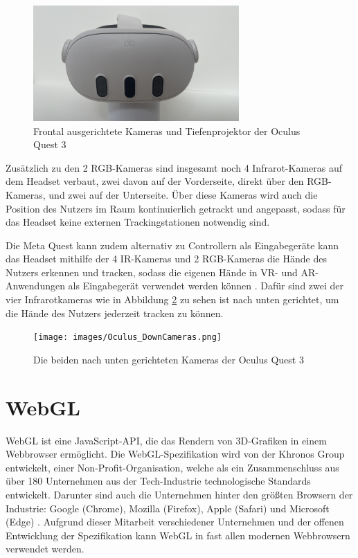 \begin{figure}[H]
  \centering
  \includegraphics[width=0.7\textwidth]{images/Oculus-FrontCameras.jpg}
  \caption{Frontal ausgerichtete Kameras und Tiefenprojektor der Oculus Quest 3}
  \label{fig:quest-front-cameras}
\end{figure}

Zusätzlich zu den 2 RGB-Kameras sind insgesamt noch 4 Infrarot-Kameras auf dem Headset verbaut, zwei davon auf der Vorderseite, direkt über den RGB-Kameras, und zwei auf der Unterseite.
Über diese Kameras wird auch die Position des Nutzers im Raum kontinuierlich getrackt und angepasst, sodass für das Headset keine externen Trackingstationen notwendig sind.

Die Meta Quest kann zudem alternativ zu Controllern als Eingabegeräte kann das Headset mithilfe der 4 IR-Kameras und 2 RGB-Kameras die Hände des Nutzers erkennen und tracken, sodass die eigenen Hände in VR- und AR-Anwendungen als Eingabegerät verwendet werden können \autocite[]{meta-quest-3}.
Dafür sind zwei der vier Infrarotkameras wie in Abbildung \ref{fig:quest-hand-cameras} zu sehen ist nach unten gerichtet, um die Hände des Nutzers jederzeit tracken zu können.

\begin{figure}[H]
  \centering
  \texttt{[image: images/Oculus\_DownCameras.png]}
  \caption{Die beiden nach unten gerichteten Kameras der Oculus Quest 3}
  \label{fig:quest-hand-cameras}
\end{figure}


\section{WebGL}

WebGL ist eine JavaScript-API, die das Rendern von 3D-Grafiken in einem Webbrowser ermöglicht.
Die WebGL-Spezifikation wird von der Khronos Group entwickelt, einer Non-Profit-Organisation, welche als ein Zusammenschluss aus über 180 Unternehmen aus der Tech-Industrie technologische Standards entwickelt.
Darunter sind auch die Unternehmen hinter den größten Browsern der Industrie: Google (Chrome), Mozilla (Firefox), Apple (Safari) und Microsoft (Edge) \autocite[]{khronos-webgl, khronos-about}.
Aufgrund dieser Mitarbeit verschiedener Unternehmen und der offenen Entwicklung der Spezifikation kann WebGL in fast allen modernen Webbrowsern verwendet werden.


